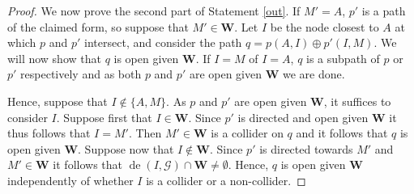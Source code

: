 \documentclass[11pt,a4paper]{article}
\theoremstyle{definition}
\theoremstyle{remark}
\DeclareMathOperator{\de}{de}
\newcommand{\g}[1][G]{\mathcal{#1}}
\begin{document}
\begin{proof}
 	 We now prove the second part of Statement \eqref{out}. If $M'=A$, $p'$ is a path of the claimed form, so suppose that $M' \in \mathbf{W}$.
	Let $I$ be the node closest to $A$ at which $p$ and $p'$ intersect, and consider the path $q=p(A,I) \oplus p'(I,M)$. We will now show that $q$ is open given $\mathbf{W}$.  If $I=M$ of $I=A$, $q$ is a subpath of $p$ or $p'$ respectively and as both $p$ and $p'$ are open given $\mathbf{W}$ we are done. 
	
	Hence, suppose that $I\notin \{A,M\}$. 
	As $p$ and $p'$ are open given $\mathbf{W}$, it suffices to consider $I$. Suppose first that $I \in \mathbf{W}$. Since $p'$ is directed and open given $\mathbf{W}$ it thus follows that $I = M'$. Then $M' \in \mathbf{W}$ is a collider on $q$ and it follows that $q$ is open given $\mathbf{W}$. 
	Suppose now that $I \notin \mathbf{W}$. Since $p'$ is directed towards $M'$ and $M' \in \mathbf{W}$ it follows that $\de(I,\g) \cap \mathbf{W} \neq \emptyset$. Hence, $q$ is open given $\mathbf{W}$ independently of whether $I$ is a collider or a non-collider.
	
	
\end{proof}
\end{document}
